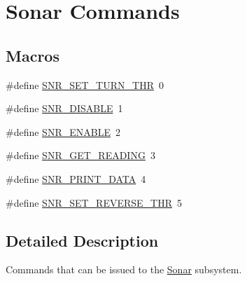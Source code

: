 \hypertarget{group__sonar__commands}{\section{Sonar Commands}
\label{group__sonar__commands}
}
\subsection*{Macros}
\begin{DoxyCompactItemize}
\item 
\#define \hyperlink{group__sonar__commands_ga514ade1790404e84c0f46b19ed69b696}{S\-N\-R\-\_\-\-S\-E\-T\-\_\-\-T\-U\-R\-N\-\_\-\-T\-H\-R}~0
\item 
\#define \hyperlink{group__sonar__commands_ga9b110968cd5bd961f4984c02965cf9ba}{S\-N\-R\-\_\-\-D\-I\-S\-A\-B\-L\-E}~1
\item 
\#define \hyperlink{group__sonar__commands_ga994c94413393c44561f42e781da5815f}{S\-N\-R\-\_\-\-E\-N\-A\-B\-L\-E}~2
\item 
\#define \hyperlink{group__sonar__commands_ga6b4b3d5c4969ca317548a1d9c8686c4f}{S\-N\-R\-\_\-\-G\-E\-T\-\_\-\-R\-E\-A\-D\-I\-N\-G}~3
\item 
\#define \hyperlink{group__sonar__commands_ga6be2722dee0ec3582372f8170b3c127b}{S\-N\-R\-\_\-\-P\-R\-I\-N\-T\-\_\-\-D\-A\-T\-A}~4
\item 
\#define \hyperlink{group__sonar__commands_gae78508a8d683aeda132c9b17ee4f384e}{S\-N\-R\-\_\-\-S\-E\-T\-\_\-\-R\-E\-V\-E\-R\-S\-E\-\_\-\-T\-H\-R}~5
\end{DoxyCompactItemize}


\subsection{Detailed Description}
Commands that can be issued to the \hyperlink{classSonar}{Sonar} subsystem. 

